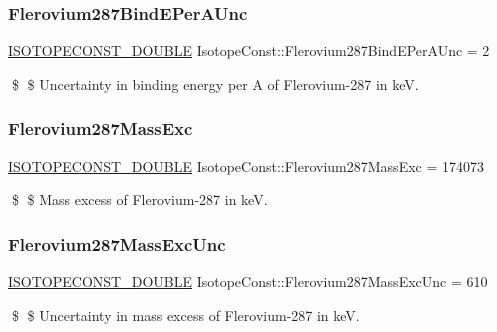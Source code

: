 \subsubsection{\texorpdfstring{Flerovium287\+Bind\+E\+Per\+A\+Unc}{Flerovium287BindEPerAUnc}}
{\footnotesize\ttfamily \mbox{\hyperlink{group___isotope_const-_macros_ga8f45a7272ce02c0b4c65c44636ed719a}{I\+S\+O\+T\+O\+P\+E\+C\+O\+N\+S\+T\+\_\+\+D\+O\+U\+B\+LE}} Isotope\+Const\+::\+Flerovium287\+Bind\+E\+Per\+A\+Unc = 2}

\$ \$ Uncertainty in binding energy per A of Flerovium-\/287 in keV. \mbox{\label{group___isotope_const-_flerovium-_fl287_gaf94ed03d584a6440465d7da599bc56e4}} 
\subsubsection{\texorpdfstring{Flerovium287\+Mass\+Exc}{Flerovium287MassExc}}
{\footnotesize\ttfamily \mbox{\hyperlink{group___isotope_const-_macros_ga8f45a7272ce02c0b4c65c44636ed719a}{I\+S\+O\+T\+O\+P\+E\+C\+O\+N\+S\+T\+\_\+\+D\+O\+U\+B\+LE}} Isotope\+Const\+::\+Flerovium287\+Mass\+Exc = 174073}

\$ \$ Mass excess of Flerovium-\/287 in keV. \mbox{\label{group___isotope_const-_flerovium-_fl287_gae53c22d9039bc4fa3cefa95936a057d1}} 
\subsubsection{\texorpdfstring{Flerovium287\+Mass\+Exc\+Unc}{Flerovium287MassExcUnc}}
{\footnotesize\ttfamily \mbox{\hyperlink{group___isotope_const-_macros_ga8f45a7272ce02c0b4c65c44636ed719a}{I\+S\+O\+T\+O\+P\+E\+C\+O\+N\+S\+T\+\_\+\+D\+O\+U\+B\+LE}} Isotope\+Const\+::\+Flerovium287\+Mass\+Exc\+Unc = 610}

\$ \$ Uncertainty in mass excess of Flerovium-\/287 in keV. \mbox{\label{group___isotope_const-_flerovium-_fl287_ga8f8944156da6602fa808a1288e43bc8f}} 
